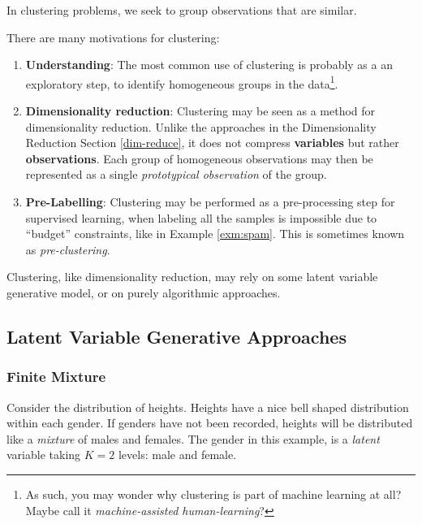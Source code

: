 \documentclass[]{book}
\providecommand{\tightlist}{%
  \setlength{\itemsep}{0pt}\setlength{\parskip}{0pt}}
\theoremstyle{definition}
\theoremstyle{definition}
\theoremstyle{definition}
\theoremstyle{remark}
\let\BeginKnitrBlock\begin \let\EndKnitrBlock\end
\begin{document}
In clustering problems, we seek to group observations that are similar.

There are many motivations for clustering:

\begin{enumerate}
\def\labelenumi{\arabic{enumi}.}
\tightlist
\item
  \textbf{Understanding}:
  The most common use of clustering is probably as a an exploratory step, to identify homogeneous groups in the data\footnote{As such, you may wonder why clustering is part of machine learning at all? Maybe call it \emph{machine-assisted human-learning}?}.
\item
  \textbf{Dimensionality reduction}:
  Clustering may be seen as a method for dimensionality reduction.
  Unlike the approaches in the Dimensionality Reduction Section \ref{dim-reduce}, it does not compress \textbf{variables} but rather \textbf{observations}.
  Each group of homogeneous observations may then be represented as a single \emph{prototypical observation} of the group.
\item
  \textbf{Pre-Labelling}:
  Clustering may be performed as a pre-processing step for supervised learning, when labeling all the samples is impossible due to ``budget'' constraints, like in Example \ref{exm:spam}. This is sometimes known as \emph{pre-clustering}.
\end{enumerate}

Clustering, like dimensionality reduction, may rely on some latent variable generative model, or on purely algorithmic approaches.

\hypertarget{latent-variable-generative-approaches-1}{%
\subsection{Latent Variable Generative Approaches}\label{latent-variable-generative-approaches-1}}

\hypertarget{finite-mixture}{%
\subsubsection{Finite Mixture}\label{finite-mixture}}

\BeginKnitrBlock{example}
\protect\hypertarget{exm:males-females}{}{\label{exm:males-females} }Consider the distribution of heights.
Heights have a nice bell shaped distribution within each gender.
If genders have not been recorded, heights will be distributed like a \emph{mixture} of males and females.
The gender in this example, is a \emph{latent} variable taking \(K=2\) levels: male and female.
\EndKnitrBlock{example}
\end{document}
